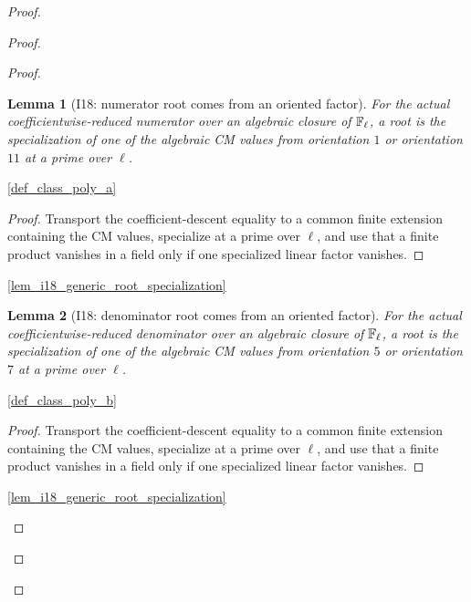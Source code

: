\documentclass[11pt,a4paper]{article}
\numberwithin{equation}{section}
\theoremstyle{plain}\newtheorem{theorem}{Theorem}[section]\newaliascnt{proposition}{theorem}\newtheorem{proposition}[proposition]{Proposition}\aliascntresetthe{proposition}\newaliascnt{lemma}{theorem}\newtheorem{lemma}[lemma]{Lemma}\aliascntresetthe{lemma}
\theoremstyle{definition}\newaliascnt{definition}{theorem}\newtheorem{definition}[definition]{Definition}\aliascntresetthe{definition}\newaliascnt{notation}{theorem}\newtheorem{notation}[notation]{Notation}\aliascntresetthe{notation}
\providecommand{\lean}[1]{}\providecommand{\leanok}{}
\begin{document}
\begin{proof}
\begin{proof}
\begin{proof}
\begin{lemma}[I18: numerator root comes from an oriented factor]\label{lem_i18_numerator_root_factor}\lean{SptCM.CM.Repaired.ActualClassPolynomialSpec.actualNumerator_root_factor}\leanok
For the actual coefficientwise-reduced numerator over an algebraic closure
of $\mathbb F_\ell$, a root is the specialization of one of the algebraic CM
values from orientation $1$ or orientation $11$ at a prime over $\ell$.
\end{lemma}
\begin{uses-statement}\ref{def_class_poly_a}\end{uses-statement}
\begin{proof}
Transport the coefficient-descent equality to a common finite extension containing the CM values, specialize at a prime over $\ell$, and use that a finite product vanishes in a field only if one specialized linear factor vanishes.
\end{proof}
\begin{uses-proof}\ref{lem_i18_generic_root_specialization}\end{uses-proof}

\begin{lemma}[I18: denominator root comes from an oriented factor]\label{lem_i18_denominator_root_factor}\lean{SptCM.CM.Repaired.ActualClassPolynomialSpec.actualDenominator_root_factor}\leanok
For the actual coefficientwise-reduced denominator over an algebraic closure
of $\mathbb F_\ell$, a root is the specialization of one of the algebraic CM
values from orientation $5$ or orientation $7$ at a prime over $\ell$.
\end{lemma}
\begin{uses-statement}\ref{def_class_poly_b}\end{uses-statement}
\begin{proof}
Transport the coefficient-descent equality to a common finite extension containing the CM values, specialize at a prime over $\ell$, and use that a finite product vanishes in a field only if one specialized linear factor vanishes.
\end{proof}
\begin{uses-proof}\ref{lem_i18_generic_root_specialization}\end{uses-proof}


\end{proof}
\end{proof}
\end{proof}
\end{document}
